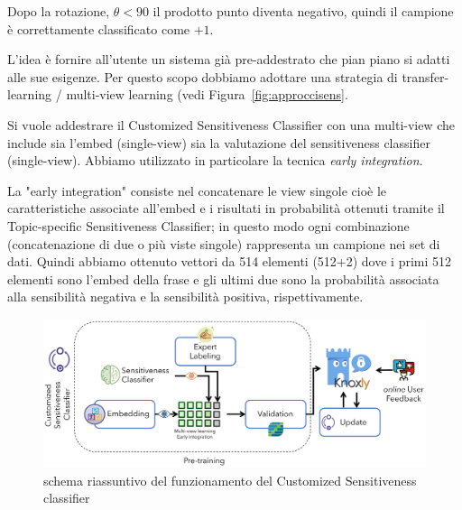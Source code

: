 Dopo la rotazione, $\theta <90$ il prodotto punto diventa negativo, quindi il campione è correttamente classificato come $+1$.

L'idea è fornire all'utente un sistema già pre-addestrato che pian piano si adatti alle sue esigenze. Per questo scopo dobbiamo adottare una strategia di transfer-learning / multi-view learning\cite{transfer-learning} (vedi Figura~\ref{fig:approccisens}.

Si vuole addestrare il Customized Sensitiveness Classifier con una multi-view che include sia l'embed (single-view) sia la valutazione del sensitiveness classifier (single-view). Abbiamo utilizzato in particolare la tecnica \textit{early integration}. 

La "early integration" consiste nel concatenare le view singole cioè le caratteristiche associate all'embed e i risultati in probabilità ottenuti tramite il Topic-specific Sensitiveness Classifier; in questo modo ogni combinazione (concatenazione di due o più viste singole) rappresenta un campione nei set di dati. Quindi abbiamo ottenuto vettori da 514 elementi (512+2) dove i primi 512 elementi sono l'embed della frase e gli ultimi due sono la probabilità associata alla sensibilità negativa e la sensibilità positiva, rispettivamente.

\begin{figure}[h]
    \centering
    \includegraphics[width=15cm]{Figure/grafici/customized_cropped.pdf}
    \caption{schema riassuntivo del funzionamento del Customized Sensitiveness classifier}
    \label{fig:approccisensCustomized}
\end{figure}
\FloatBarrier


